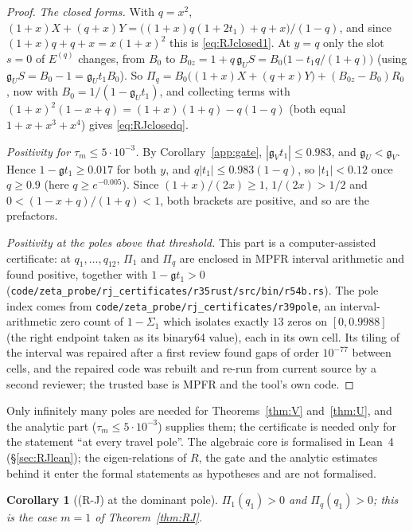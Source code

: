 \documentclass[11pt]{article}
\theoremstyle{plain}
\newtheorem{corollary}[theorem]{Corollary}
\theoremstyle{definition}
\theoremstyle{remark}
\begin{document}
\begin{proof}
\emph{The closed forms.} With $q=x^2$,
$(1+x)X+(q+x)Y=\bigl((1+x)q(1+2t_1)+q+x\bigr)/(1-q)$, and since
$(1+x)q+q+x=x(1+x)^2$ this is \eqref{eq:RJclosed1}. At $y=q$ only the slot $s=0$ of $E^{(q)}$
changes, from $B_0$ to $B_{0z}=1+q\,\mathfrak g_US=B_0\bigl(1-t_1q/(1+q)\bigr)$ (using
$\mathfrak g_US=B_0-1=\mathfrak g_Ut_1B_0$). So
$\Pi_q=B_0\bigl((1+x)X+(q+x)Y\bigr)+(B_{0z}-B_0)R_0$, now with $B_0=1/(1-\mathfrak g_Ut_1)$, and
collecting terms with $(1+x)^2(1-x+q)=(1+x)(1+q)-q(1-q)$ (both equal $1+x+x^3+x^4$) gives
\eqref{eq:RJclosedq}.

\emph{Positivity for $\tau_m\le5\cdot10^{-3}$.} By Corollary~\ref{app:gate}, $|\mathfrak g_Vt_1|\le0.983$,
and $\mathfrak g_U<\mathfrak g_V$. Hence $1-\mathfrak gt_1\ge0.017$ for both $y$, and
$q|t_1|\le0.983(1-q)$, so $|t_1|<0.12$ once $q\ge0.9$ (here $q\ge e^{-0.005}$). Since
$(1+x)/(2x)\ge1$, $1/(2x)>1/2$ and $0<(1-x+q)/(1+q)<1$, both brackets are positive, and so are the
prefactors.

\emph{Positivity at the poles above that threshold.} This part is a computer-assisted certificate:
at $q_1,\dots,q_{12}$, $\Pi_1$ and $\Pi_q$ are enclosed in MPFR interval arithmetic and found positive,
together with $1-\mathfrak gt_1>0$ (\texttt{code/zeta\_probe/rj\_certificates/r35rust/src/bin/r54b.rs}). The pole
index comes from \texttt{code/zeta\_probe/rj\_certificates/r39pole}, an interval-arithmetic zero count
of $1-\Sigma_1$ which isolates exactly $13$ zeros on $[0,0.9988]$ \textup{(}the right endpoint
taken as its binary64 value\textup{)}, each in its own cell. Its tiling of the interval was repaired
after a first review found gaps of order $10^{-77}$ between cells, and the repaired code was rebuilt
and re-run from current source by a second reviewer; the trusted base is MPFR and the tool's own code.
\end{proof}

\noindent Only infinitely many poles are needed for Theorems~\ref{thm:V} and~\ref{thm:U}, and the
analytic part ($\tau_m\le5\cdot10^{-3}$) supplies them; the certificate is needed only for the
statement ``at every travel pole''. The algebraic core is formalised in Lean~4
(\S\ref{sec:RJlean}); the eigen-relations of $R$, the gate and the analytic estimates behind it enter
the formal statements as hypotheses and are not formalised.

\begin{corollary}[\textup{(R-J)} at the dominant pole]\label{prop:RJdominant}
$\Pi_1(q_1)>0$ and $\Pi_q(q_1)>0$; this is the case $m=1$ of Theorem~\ref{thm:RJ}.
\end{corollary}
\end{document}
